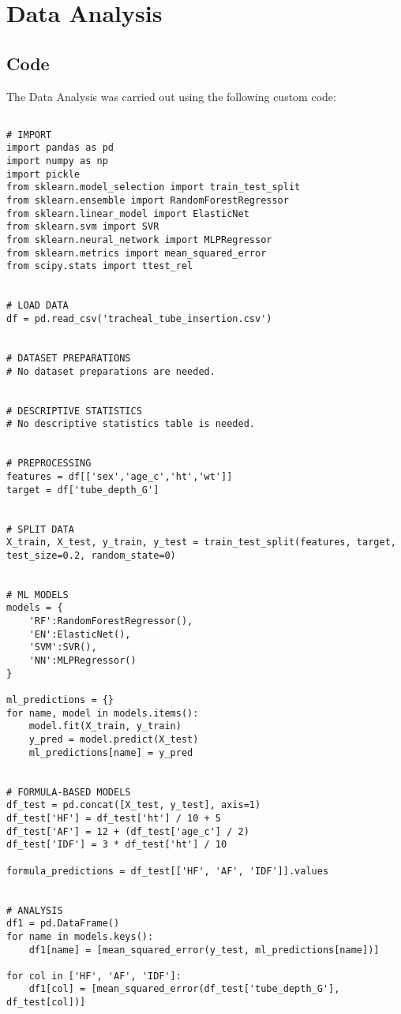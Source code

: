 \documentclass[11pt]{article}
\begin{document}
\section{Data Analysis}
\subsection{{Code}}
The Data Analysis was carried out using the following custom code:

\begin{verbatim}

# IMPORT
import pandas as pd
import numpy as np
import pickle
from sklearn.model_selection import train_test_split
from sklearn.ensemble import RandomForestRegressor
from sklearn.linear_model import ElasticNet
from sklearn.svm import SVR
from sklearn.neural_network import MLPRegressor
from sklearn.metrics import mean_squared_error
from scipy.stats import ttest_rel


# LOAD DATA
df = pd.read_csv('tracheal_tube_insertion.csv')


# DATASET PREPARATIONS
# No dataset preparations are needed.


# DESCRIPTIVE STATISTICS
# No descriptive statistics table is needed.


# PREPROCESSING
features = df[['sex','age_c','ht','wt']]
target = df['tube_depth_G']


# SPLIT DATA
X_train, X_test, y_train, y_test = train_test_split(features, target, test_size=0.2, random_state=0)


# ML MODELS
models = {
    'RF':RandomForestRegressor(),
    'EN':ElasticNet(),
    'SVM':SVR(),
    'NN':MLPRegressor()
}

ml_predictions = {}
for name, model in models.items():
    model.fit(X_train, y_train)
    y_pred = model.predict(X_test)
    ml_predictions[name] = y_pred


# FORMULA-BASED MODELS
df_test = pd.concat([X_test, y_test], axis=1)
df_test['HF'] = df_test['ht'] / 10 + 5
df_test['AF'] = 12 + (df_test['age_c'] / 2)
df_test['IDF'] = 3 * df_test['ht'] / 10 

formula_predictions = df_test[['HF', 'AF', 'IDF']].values


# ANALYSIS
df1 = pd.DataFrame()
for name in models.keys():
    df1[name] = [mean_squared_error(y_test, ml_predictions[name])]

for col in ['HF', 'AF', 'IDF']:
    df1[col] = [mean_squared_error(df_test['tube_depth_G'], df_test[col])]


\end{verbatim}
\end{document}
